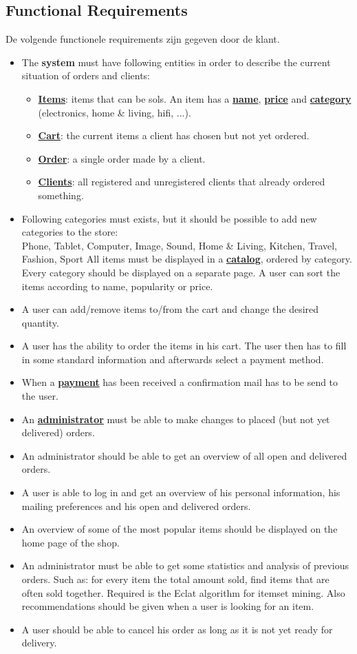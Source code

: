 \documentclass[•]{article}
\begin{document}
\subsection{Functional Requirements}
De volgende functionele requirements zijn gegeven door de klant.
\begin{itemize}
\item The \textbf{system} must have following entities in order to describe the current
situation of orders and clients:
\begin{itemize}
\item \textbf{\underline{Items}}: items that can be sols. An item has a \textbf{\underline{name}}, \textbf{\underline{price}} and \textbf{\underline{category}} (electronics, home \& living, hifi, ...).
\item \textbf{\underline{Cart}}: the current items a client has chosen but not yet ordered.
\item \textbf{\underline{Order}}: a single order made by a client.
\item \textbf{\underline{Clients}}: all registered and unregistered clients that already ordered
something.
\end{itemize}
\item Following categories must exists, but it should be possible to add new
categories to the store:\\
Phone, Tablet, Computer, Image, Sound, Home \& Living, Kitchen, Travel,
Fashion, Sport
All items must be displayed in a \textbf{\underline{catalog}}, ordered by category. Every
category should be displayed on a separate page. A user can sort the
items according to name, popularity or price.
\item A user can add/remove items to/from the cart and change the desired
quantity.
\item A user has the ability to order the items in his cart. The user then has to
fill in some standard information and afterwards select a payment method.
\item When a \textbf{\underline{payment}} has been received a confirmation mail has to be send to
the user.
\item An \textbf{\underline{administrator}} must be able to make changes to placed (but not yet
delivered) orders.
\item An administrator should be able to get an overview of all open and delivered orders.
\item A user is able to log in and get an overview of his personal information,
his mailing preferences and his open and delivered orders.
\item An overview of some of the most popular items should be displayed on
the home page of the shop.
\item An administrator must be able to get some statistics and analysis of previous orders. Such as: for every item the total amount sold, find items
that are often sold together. Required is the Eclat algorithm for itemset
mining. Also recommendations should be given when a user is looking for
an item.
\item A user should be able to cancel his order as long as it is not yet ready for delivery.

\end{itemize}
\end{document}
